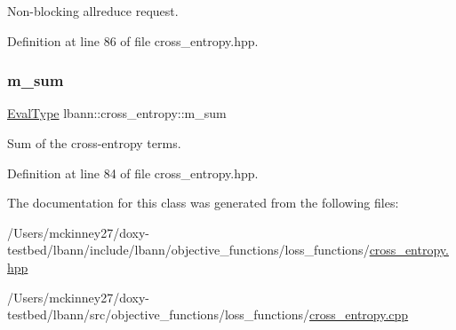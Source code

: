 Non-\/blocking allreduce request. 

Definition at line 86 of file cross\+\_\+entropy.\+hpp.

\mbox{\label{classlbann_1_1cross__entropy_a0eea3d755b963149cb364e722a7352d8}} 
\subsubsection{\texorpdfstring{m\+\_\+sum}{m\_sum}}
{\footnotesize\ttfamily \hyperlink{base_8hpp_a3266f5ac18504bbadea983c109566867}{Eval\+Type} lbann\+::cross\+\_\+entropy\+::m\+\_\+sum\hspace{0.3cm}{\ttfamily [private]}}

Sum of the cross-\/entropy terms. 

Definition at line 84 of file cross\+\_\+entropy.\+hpp.



The documentation for this class was generated from the following files\+:\begin{DoxyCompactItemize}
\item 
/\+Users/mckinney27/doxy-\/testbed/lbann/include/lbann/objective\+\_\+functions/loss\+\_\+functions/\hyperlink{cross__entropy_8hpp}{cross\+\_\+entropy.\+hpp}\item 
/\+Users/mckinney27/doxy-\/testbed/lbann/src/objective\+\_\+functions/loss\+\_\+functions/\hyperlink{cross__entropy_8cpp}{cross\+\_\+entropy.\+cpp}\end{DoxyCompactItemize}
